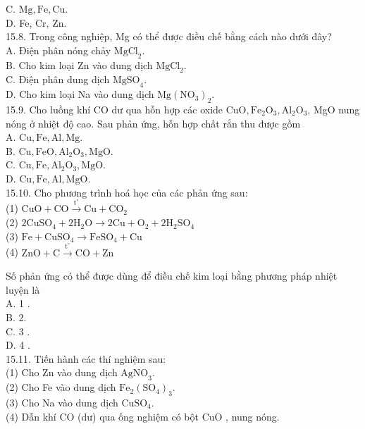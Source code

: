 \documentclass[10pt]{article}
\begin{document}
C. $\mathrm{Mg}, \mathrm{Fe}, \mathrm{Cu}$.\\
D. Fe, Cr, Zn.\\
15.8. Trong công nghiệp, Mg có thể được điều chế bằng cách nào dưới đây?\\
A. Điện phân nóng chảy $\mathrm{MgCl}_{2}$.\\
B. Cho kim loại Zn vào dung dịch $\mathrm{MgCl}_{2}$.\\
C. Điện phân dung dịch $\mathrm{MgSO}_{4}$.\\
D. Cho kim loại Na vào dung dịch $\mathrm{Mg}\left(\mathrm{NO}_{3}\right)_{2}$.\\
15.9. Cho luồng khí CO dư qua hỗn hợp các oxide $\mathrm{CuO}, \mathrm{Fe}_{2} \mathrm{O}_{3}, \mathrm{Al}_{2} \mathrm{O}_{3}$, MgO nung nóng ở nhiệt độ cao. Sau phản ứng, hỗn hợp chất rắn thu được gồm\\
A. $\mathrm{Cu}, \mathrm{Fe}, \mathrm{Al}, \mathrm{Mg}$.\\
B. $\mathrm{Cu}, \mathrm{FeO}, \mathrm{Al}_{2} \mathrm{O}_{3}, \mathrm{MgO}$.\\
C. $\mathrm{Cu}, \mathrm{Fe}, \mathrm{Al}_{2} \mathrm{O}_{3}, \mathrm{MgO}$.\\
D. $\mathrm{Cu}, \mathrm{Fe}, \mathrm{Al}, \mathrm{MgO}$.\\
15.10. Cho phương trình hoá học của các phản ứng sau:\\
(1) $\mathrm{CuO}+\mathrm{CO} \xrightarrow{\mathrm{t}^{\circ}} \mathrm{Cu}+\mathrm{CO}_{2}$\\
(2) $2 \mathrm{CuSO}_{4}+2 \mathrm{H}_{2} \mathrm{O} \rightarrow 2 \mathrm{Cu}+\mathrm{O}_{2}+2 \mathrm{H}_{2} \mathrm{SO}_{4}$\\
(3) $\mathrm{Fe}+\mathrm{CuSO}_{4} \rightarrow \mathrm{FeSO}_{4}+\mathrm{Cu}$\\
(4) $\mathrm{ZnO}+\mathrm{C} \xrightarrow{\mathrm{t}^{\circ}} \mathrm{CO}+\mathrm{Zn}$

Số phản ứng có thể được dùng để điều chế kim loại bằng phương pháp nhiệt luyện là\\
A. 1 .\\
B. 2.\\
C. 3 .\\
D. 4 .\\
15.11. Tiến hành các thí nghiệm sau:\\
(1) Cho Zn vào dung dịch $\mathrm{AgNO}_{3}$.\\
(2) Cho Fe vào dung dịch $\mathrm{Fe}_{2}\left(\mathrm{SO}_{4}\right)_{3}$.\\
(3) Cho Na vào dung dịch $\mathrm{CuSO}_{4}$.\\
(4) Dẫn khí CO (dư) qua ống nghiệm có bột CuO , nung nóng.
\end{document}
